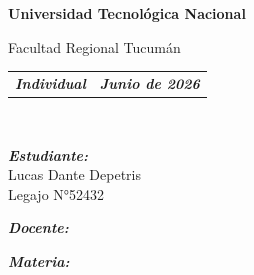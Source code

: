 \begin{titlepage}
    \centering
    {\bfseries \Huge Universidad Tecnológica Nacional \par}
    {\Huge Facultad Regional Tucumán \par}
    \vspace{0.35cm}
    {\Large \carrera \par}
    \vspace{-0.25cm}
    \begin{table}[h]
        \centering
            \begin{tabular}{c|c}
                \textit{\textbf{Individual}} & \textit{\textbf{Junio de 2026}}
            \end{tabular}
    \end{table}

    \vspace{4.7cm}
    \hrulefill \\
    {\bfseries \Huge \trabajoPractico \par}
    \vspace{0.5cm}
    {\Large \tituloProyecto \par}
    \hrulefill

    \vspace{3cm}
    \begin{flushleft}
        \large
        \textit{\textbf{Estudiante:}}\\
        Lucas Dante Depetris\\
        Legajo N\si{\degree}52432

        \vspace{0.6cm}
        \textit{\textbf{Docente:}}\\
        \docenteSupervisor

        \vspace{0.6cm}
        \textit{\textbf{Materia:}}\\
        \materia
    \end{flushleft}
\end{titlepage}
